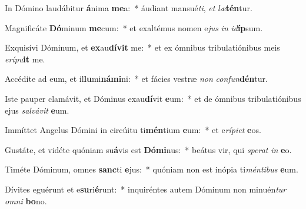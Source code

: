 \item In Dómino laudábitur \textbf{á}nima \textbf{me}a:~* áudiant mansué\textit{ti}, \textit{et} \textit{læ}\textbf{tén}tur.
\item Magnificáte \textbf{Dó}minum \textbf{me}cum:~* et exaltémus nomen e\textit{jus} \textit{in} \textit{id}\textbf{íp}sum.
\item Exquisívi Dóminum, et \textbf{ex}au\textbf{dí}\textbf{vit} me:~* et ex ómnibus tribulatiónibus meis \textit{e}\textit{rí}\textit{pu}\textbf{it} me.
\item Accédite ad eum, et il\textbf{lu}mi\textbf{ná}\textbf{mi}ni:~* et fácies vestræ \textit{non} \textit{con}\textit{fun}\textbf{dén}tur.
\item Iste pauper clamávit, et Dóminus exau\textbf{dí}vit \textbf{e}um:~* et de ómnibus tribulatiónibus ejus \textit{sal}\textit{vá}\textit{vit} \textbf{e}um.
\item Immíttet Angelus Dómini in circúitu ti\textbf{mén}tium \textbf{e}um:~* et e\textit{rí}\textit{pi}\textit{et} \textbf{e}os.
\item Gustáte, et vidéte quóniam su\textbf{á}vis est \textbf{Dó}\textbf{mi}nus:~* beátus vir, qui \textit{spe}\textit{rat} \textit{in} \textbf{e}o.
\item Timéte Dóminum, omnes \textbf{sanc}ti \textbf{e}jus:~* quóniam non est inópia ti\textit{mén}\textit{ti}\textit{bus} \textbf{e}um.
\item Dívites eguérunt et e\textbf{su}ri\textbf{é}runt:~* inquiréntes autem Dóminum non minuén\textit{tur} \textit{om}\textit{ni} \textbf{bo}no.
